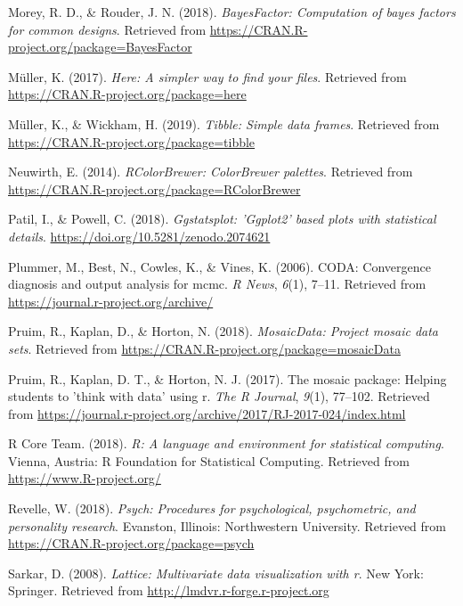 \documentclass[
  english,
  man]{apa6}
\begin{document}
\leavevmode\hypertarget{ref-R-BayesFactor}{}%
Morey, R. D., \& Rouder, J. N. (2018). \emph{BayesFactor: Computation of bayes factors for common designs}. Retrieved from \url{https://CRAN.R-project.org/package=BayesFactor}

\leavevmode\hypertarget{ref-R-here}{}%
Müller, K. (2017). \emph{Here: A simpler way to find your files}. Retrieved from \url{https://CRAN.R-project.org/package=here}

\leavevmode\hypertarget{ref-R-tibble}{}%
Müller, K., \& Wickham, H. (2019). \emph{Tibble: Simple data frames}. Retrieved from \url{https://CRAN.R-project.org/package=tibble}

\leavevmode\hypertarget{ref-R-RColorBrewer}{}%
Neuwirth, E. (2014). \emph{RColorBrewer: ColorBrewer palettes}. Retrieved from \url{https://CRAN.R-project.org/package=RColorBrewer}

\leavevmode\hypertarget{ref-R-ggstatsplot}{}%
Patil, I., \& Powell, C. (2018). \emph{Ggstatsplot: 'Ggplot2' based plots with statistical details}. \url{https://doi.org/10.5281/zenodo.2074621}

\leavevmode\hypertarget{ref-R-coda}{}%
Plummer, M., Best, N., Cowles, K., \& Vines, K. (2006). CODA: Convergence diagnosis and output analysis for mcmc. \emph{R News}, \emph{6}(1), 7--11. Retrieved from \url{https://journal.r-project.org/archive/}

\leavevmode\hypertarget{ref-R-mosaicData}{}%
Pruim, R., Kaplan, D., \& Horton, N. (2018). \emph{MosaicData: Project mosaic data sets}. Retrieved from \url{https://CRAN.R-project.org/package=mosaicData}

\leavevmode\hypertarget{ref-R-mosaic}{}%
Pruim, R., Kaplan, D. T., \& Horton, N. J. (2017). The mosaic package: Helping students to 'think with data' using r. \emph{The R Journal}, \emph{9}(1), 77--102. Retrieved from \url{https://journal.r-project.org/archive/2017/RJ-2017-024/index.html}

\leavevmode\hypertarget{ref-R-base}{}%
R Core Team. (2018). \emph{R: A language and environment for statistical computing}. Vienna, Austria: R Foundation for Statistical Computing. Retrieved from \url{https://www.R-project.org/}

\leavevmode\hypertarget{ref-R-psych}{}%
Revelle, W. (2018). \emph{Psych: Procedures for psychological, psychometric, and personality research}. Evanston, Illinois: Northwestern University. Retrieved from \url{https://CRAN.R-project.org/package=psych}

\leavevmode\hypertarget{ref-R-lattice}{}%
Sarkar, D. (2008). \emph{Lattice: Multivariate data visualization with r}. New York: Springer. Retrieved from \url{http://lmdvr.r-forge.r-project.org}
\end{document}
